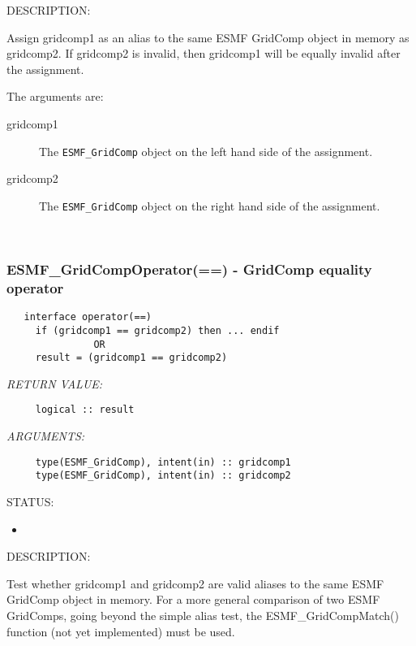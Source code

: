 {\sf DESCRIPTION:\\ }


     Assign gridcomp1 as an alias to the same ESMF GridComp object in memory
     as gridcomp2. If gridcomp2 is invalid, then gridcomp1 will be equally invalid after
     the assignment.
  
     The arguments are:
     \begin{description}
     \item[gridcomp1]
       The {\tt ESMF\_GridComp} object on the left hand side of the assignment.
     \item[gridcomp2]
       The {\tt ESMF\_GridComp} object on the right hand side of the assignment.
     \end{description}
   
 
\mbox{}\hrulefill\ 
 
\subsubsection [ESMF\_GridCompOperator(==)] {ESMF\_GridCompOperator(==) - GridComp equality operator}


  
\begin{verbatim}   interface operator(==)
     if (gridcomp1 == gridcomp2) then ... endif
               OR
     result = (gridcomp1 == gridcomp2)\end{verbatim}{\em RETURN VALUE:}
\begin{verbatim}     logical :: result\end{verbatim}{\em ARGUMENTS:}
\begin{verbatim}     type(ESMF_GridComp), intent(in) :: gridcomp1
     type(ESMF_GridComp), intent(in) :: gridcomp2\end{verbatim}
{\sf STATUS:}
   \begin{itemize}
   \item{}
   \end{itemize}
  
{\sf DESCRIPTION:\\ }


     Test whether gridcomp1 and gridcomp2 are valid aliases to the same ESMF
     GridComp object in memory. For a more general comparison of two ESMF GridComps,
     going beyond the simple alias test, the ESMF\_GridCompMatch() function (not yet
     implemented) must be used.
  
